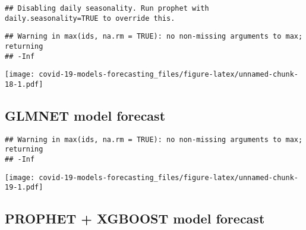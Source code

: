 \documentclass[
]{article}
\newenvironment{Shaded}{\begin{snugshade}}{\end{snugshade}}
\newcommand{\CommentTok}[1]{\textcolor[rgb]{0.56,0.35,0.01}{\textit{#1}}}
\newcommand{\DataTypeTok}[1]{\textcolor[rgb]{0.13,0.29,0.53}{#1}}
\newcommand{\DecValTok}[1]{\textcolor[rgb]{0.00,0.00,0.81}{#1}}
\newcommand{\KeywordTok}[1]{\textcolor[rgb]{0.13,0.29,0.53}{\textbf{#1}}}
\newcommand{\NormalTok}[1]{#1}
\newcommand{\OperatorTok}[1]{\textcolor[rgb]{0.81,0.36,0.00}{\textbf{#1}}}
\newcommand{\OtherTok}[1]{\textcolor[rgb]{0.56,0.35,0.01}{#1}}
\newcommand{\StringTok}[1]{\textcolor[rgb]{0.31,0.60,0.02}{#1}}
\begin{document}
\begin{verbatim}
## Disabling daily seasonality. Run prophet with daily.seasonality=TRUE to override this.
\end{verbatim}

\begin{verbatim}
## Warning in max(ids, na.rm = TRUE): no non-missing arguments to max; returning
## -Inf
\end{verbatim}

\texttt{[image: covid-19-models-forecasting\_files/figure-latex/unnamed-chunk-18-1.pdf]}

\hypertarget{glmnet-model-forecast}{%
\subsection{GLMNET model forecast}\label{glmnet-model-forecast}}

\begin{Shaded}
\end{Shaded}

\begin{verbatim}
## Warning in max(ids, na.rm = TRUE): no non-missing arguments to max; returning
## -Inf
\end{verbatim}

\texttt{[image: covid-19-models-forecasting\_files/figure-latex/unnamed-chunk-19-1.pdf]}

\hypertarget{prophet-xgboost-model-forecast}{%
\subsection{PROPHET + XGBOOST model
forecast}\label{prophet-xgboost-model-forecast}}
\end{document}
